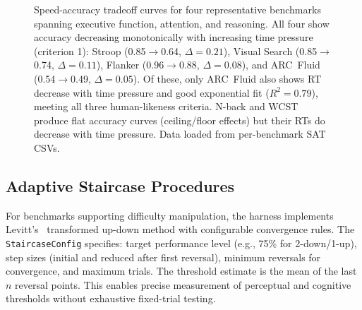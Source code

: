 \documentclass[11pt,letterpaper]{article}
\begin{document}
\begin{figure}[t]
\centering
{}\satstroop
{}\satflanker
{}\satvisualsearch
{}\satarcfluid
{}
\caption{Speed-accuracy tradeoff curves for four representative benchmarks spanning executive function, attention, and reasoning. All four show accuracy decreasing monotonically with increasing time pressure (criterion 1): Stroop (0.85$\to$0.64, $\Delta = 0.21$), Visual Search (0.85$\to$0.74, $\Delta = 0.11$), Flanker (0.96$\to$0.88, $\Delta = 0.08$), and ARC~Fluid (0.54$\to$0.49, $\Delta = 0.05$). Of these, only ARC~Fluid also shows RT decrease with time pressure and good exponential fit ($R^2 = 0.79$), meeting all three human-likeness criteria. N-back and WCST produce flat accuracy curves (ceiling/floor effects) but their RTs do decrease with time pressure. Data loaded from per-benchmark SAT CSVs.}
\label{fig:sat}
\end{figure}

\subsection{Adaptive Staircase Procedures}

For benchmarks supporting difficulty manipulation, the harness implements Levitt's~\citep{levitt1971transformed} transformed up-down method with configurable convergence rules. The \texttt{StaircaseConfig} specifies: target performance level (e.g., 75\% for 2-down/1-up), step sizes (initial and reduced after first reversal), minimum reversals for convergence, and maximum trials. The threshold estimate is the mean of the last $n$ reversal points. This enables precise measurement of perceptual and cognitive thresholds without exhaustive fixed-trial testing.
\end{document}
